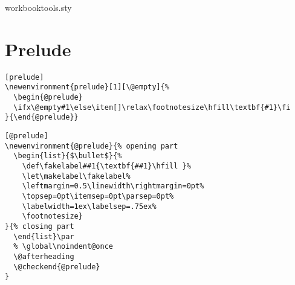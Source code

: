 \documentclass{article}
\begin{document}
\begin{package}{workbooktools.sty}
\begin{source}[\@maketitle]
\def\@maketitle{\newpage
 \null
 \vskip 2em                 %
\begingroup
  \def\and{\unskip, }
  \parindent=\z@
  \pretolerance=10000
  \rightskip=\z@ \@plus 3cm
  {\LARGE                   %
   \lineskip .5em
   \textbf{\@author}
   \par}%
  \vskip 2cm                %
  {\Huge \textbf{\@title} \par}%
  \vskip 1cm                %
  \if!\@subtitle!\else
   {\LARGE\ignorespaces\@subtitle \par}
   \vskip 1cm                %
  \fi
  \if!\@date!\else
    {\large \@date}%
    \par
    \vskip 1.5em               %
  \fi
 \vfill
 {\Large Springer\par}
\endgroup}
\end{source}

\begin{source}[\subtitle]
\def\subtitle#1{\gdef\@subtitle{#1}}
\end{source}

\begin{source}[\@subtitle]
\def\@subtitle{}
\end{source}


\section{Prelude}

\begin{verbatim}[prelude]
\newenvironment{prelude}[1][\@empty]{%
  \begin{@prelude}
  \ifx\@empty#1\else\item[]\relax\footnotesize\hfill\textbf{#1}\fi
}{\end{@prelude}}
\end{verbatim}

\begin{verbatim}[@prelude]
\newenvironment{@prelude}{% opening part
  \begin{list}{$\bullet$}{%
    \def\fakelabel##1{\textbf{##1}\hfill }%
    \let\makelabel\fakelabel%
    \leftmargin=0.5\linewidth\rightmargin=0pt%
    \topsep=0pt\itemsep=0pt\parsep=0pt%
    \labelwidth=1ex\labelsep=.75ex%
    \footnotesize}
}{% closing part
  \end{list}\par
  % \global\noindent@once
  \@afterheading
  \@checkend{@prelude}
}
\end{verbatim}


\end{package}
\end{document}
